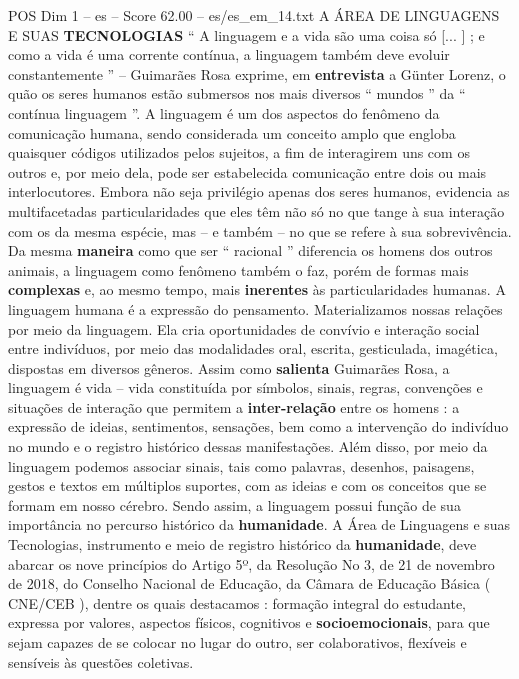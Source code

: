 \begin{textsample}{POS Dim 1 – es – Score 62.00 – es/es\_em\_14.txt}  \label{ex:f1_pos_191}
A ÁREA DE LINGUAGENS E SUAS \textbf{TECNOLOGIAS} “ A linguagem e a vida são uma coisa só [... ] ; e como a vida é uma corrente contínua, a linguagem também deve evoluir constantemente ” – Guimarães Rosa exprime, em \textbf{entrevista} a Günter Lorenz, o quão os seres humanos estão submersos nos mais diversos “ mundos ” da “ contínua linguagem ”.
A linguagem é um dos aspectos do fenômeno da comunicação humana, sendo considerada um conceito amplo que engloba quaisquer códigos utilizados pelos sujeitos, a fim de interagirem uns com os outros e, por meio dela, pode ser estabelecida comunicação entre dois ou mais interlocutores.
Embora não seja privilégio apenas dos seres humanos, evidencia as multifacetadas particularidades que eles têm não só no que tange à sua interação com os da mesma espécie, mas – e também – no que se refere à sua sobrevivência.
Da mesma \textbf{maneira} como que ser “ racional ” diferencia os homens dos outros animais, a linguagem como fenômeno também o faz, porém de formas mais \textbf{complexas} e, ao mesmo tempo, mais \textbf{inerentes} às particularidades humanas.
A linguagem humana é a expressão do pensamento.
Materializamos nossas relações por meio da linguagem.
Ela cria oportunidades de convívio e interação social entre indivíduos, por meio das modalidades oral, escrita, gesticulada, imagética, dispostas em diversos gêneros.
Assim como \textbf{salienta} Guimarães Rosa, a linguagem é vida – vida constituída por símbolos, sinais, regras, convenções e situações de interação que permitem a \textbf{inter-relação} entre os homens : a expressão de ideias, sentimentos, sensações, bem como a intervenção do indivíduo no mundo e o registro histórico dessas manifestações.
Além disso, por meio da linguagem podemos associar sinais, tais como palavras, desenhos, paisagens, gestos e textos em múltiplos suportes, com as ideias e com os conceitos que se formam em nosso cérebro.
Sendo assim, a linguagem possui função de sua importância no percurso histórico da \textbf{humanidade}.
A Área de Linguagens e suas Tecnologias, instrumento e meio de registro histórico da \textbf{humanidade}, deve abarcar os nove princípios do Artigo 5º, da Resolução No 3, de 21 de novembro de 2018, do Conselho Nacional de Educação, da Câmara de Educação Básica ( CNE/CEB ), dentre os quais destacamos : formação integral do estudante, expressa por valores, aspectos físicos, cognitivos e \textbf{socioemocionais}, para que sejam capazes de se colocar no lugar do outro, ser colaborativos, flexíveis e sensíveis às questões coletivas.

\end{textsample}
